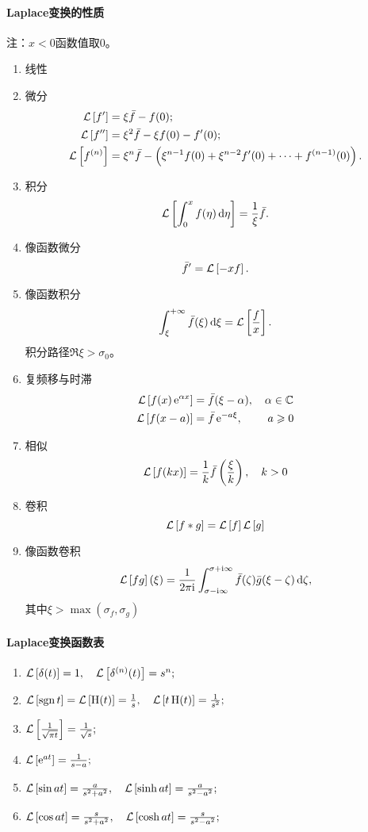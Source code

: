 \paragraph{Laplace变换的性质}注：$x<0$函数值取0。
\begin{enumerate}
	\item 线性
	\item 微分
	\begin{align*}
		\mathcal L\left[f'\right]&=\xi\bar f-f(0);\\
		\mathcal L\left[f''\right]&=\xi^2\bar f-\xi f(0)-f'(0);\\
		\mathcal L\left[f^{(n)}\right]&=\xi^n\bar f-\left(\xi^{n-1}f(0)+\xi^{n-2}f'(0)+\cdots+f^{(n-1)}(0)\right).
	\end{align*}
	\item 积分 
	\[
		\mathcal L\left[\int_0^xf(\eta)\mathop{}\!\mathrm{d}\eta\right]=\frac1\xi\bar f.
		\]
	\item 像函数微分
	\[
		\bar f'=\mathcal L\left[-xf\right].
		\]
	\item 像函数积分
	\[
		\int_\xi^{+\infty}\bar f(\xi)\mathop{}\!\mathrm{d}\xi=\mathcal L\left[\frac fx\right].
		\]
	积分路径$\Re\xi>\sigma_0$。
	\item 复频移与时滞
	\begin{align*}
		\cl{f(x)\e{\alpha x}}&=\bar f(\xi-\alpha),\quad \alpha\in\CC\\
		\cl{f(x-a)}&=\bar f\e{-a\xi},\qquad\; a\geqslant 0 %
	\end{align*}
	\item 相似
	\[
		\mathcal L\left[f(kx)\right]=\frac1k\bar f\left(\frac\xi{k}\right),\quad k>0
		\]
	\item 卷积
	\[
		\mathcal L\left[f\ast g\right]=\mathcal L\left[f\right]\mathcal L\left[g\right]
		\]
	\item 像函数卷积
	\[
		\mathcal L\left[fg\right](\xi)=\frac1{2\pi\mathrm{i}}\int_{\sigma-\mathrm{i}\infty}^{\sigma+\mathrm{i}\infty}\bar f(\zeta)\bar g(\xi-\zeta)\mathop{}\!\mathrm{d}\zeta,
		\]
	其中$\xi>\max(\sigma_f,\sigma_g)$
\end{enumerate}
\paragraph{Laplace变换函数表}
\begin{enumerate}
	\item $\mathcal L\left[\mathop{}\!\delta(t)\right]=1,\quad\mathcal L\left[\mathop{}\!\delta^{(n)}(t)\right]=s^n;$
	\item $\mathcal L\left[\operatorname{sgn} t\right]=\mathcal L\left[\operatorname{H}(t)\right]=\frac1s,\quad \mathcal L\left[t\operatorname{H}(t)\right]=\frac1{s^2};$
	\item $\mathcal L\left[\frac1{\sqrt{\pi t}}\right]=\frac1{\sqrt s};$%
	\item $\mathcal L\left[\mathop{}\!\mathrm{e}^{at}\right]=\frac1{s-a};$
	\item $\mathcal L\left[\sin at\right]=\frac a{s^2+a^2},\quad \mathcal L\left[\sinh at\right]=\frac a{s^2-a^2};$
	\item $\mathcal L\left[\cos at\right]=\frac s{s^2+a^2},\quad \mathcal L\left[\cosh at\right]=\frac s{s^2-a^2};$
\end{enumerate}

